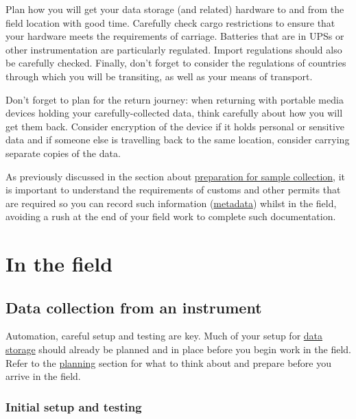 \documentclass[12pt,a4paper,oneside]{report}
\begin{document}
Plan how you will get your data storage (and related) hardware to and
from the field location with good time. Carefully check cargo
restrictions to ensure that your hardware meets the requirements of
carriage. Batteries that are in UPSs or other instrumentation are
particularly regulated. Import regulations should also be carefully
checked. Finally, don't forget to consider the regulations of countries
through which you will be transiting, as well as your means of
transport.

Don't forget to plan for the return journey: when returning with
portable media devices holding your carefully-collected data, think
carefully about how you will get them back. Consider encryption of the
device if it holds personal or sensitive data and if someone else is
travelling back to the same location, consider carrying separate copies
of the data.

As previously discussed in the section about
\protect\hyperlink{preparing-for-sample-collection}{preparation for
sample collection}, it is important to understand the requirements of
customs and other permits that are required so you can record such
information (\protect\hyperlink{metadata}{metadata}) whilst in the
field, avoiding a rush at the end of your field work to complete such
documentation.

\hypertarget{in-the-field}{%
\chapter{In the field}\label{in-the-field}}

\hypertarget{data-collection-from-an-instrument}{%
\section{Data collection from an
instrument}\label{data-collection-from-an-instrument}}

Automation, careful setup and testing are key. Much of your setup for
\protect\hyperlink{storing-data}{data storage} should already be planned
and in place before you begin work in the field. Refer to the
\protect\hyperlink{before-you-go}{planning} section for what to think
about and prepare before you arrive in the field.

\hypertarget{initial-setup-and-testing}{%
\subsection{Initial setup and testing}\label{initial-setup-and-testing}}
\end{document}
